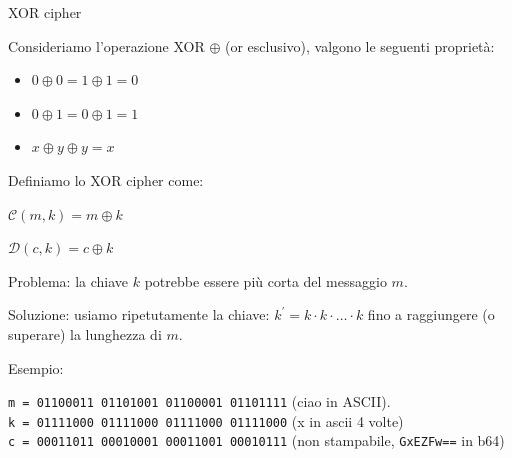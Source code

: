 \documentclass[xcolor=dvipsnames,aspectratio=169]{beamer}
\begin{document}
\begin{frame}{XOR cipher}

  Consideriamo l'operazione XOR $\oplus$ (or esclusivo), valgono le seguenti proprietà:
  
  \begin{itemize}
    \item $0 \oplus 0 = 1 \oplus 1 = 0$ 
    \item $0 \oplus 1 = 0 \oplus 1 = 1$ 
    \item $x \oplus y \oplus y = x$ 
  \end{itemize}
  
  \medskip
  \pause
  
  Definiamo lo XOR cipher come:
    
  $\mathcal{C}(m, k) = m \oplus k$ 
  
  $\mathcal{D}(c, k) = c \oplus k$

  \medskip
  
  \pause

  Problema: la chiave $k$ potrebbe essere più corta del messaggio $m$.
  
  Soluzione: usiamo ripetutamente la chiave: $k^{'} = k \cdot k \cdot \ldots \cdot k$ fino a raggiungere (o superare) la lunghezza di $m$.

  \medskip
  \pause
  
  Esempio:
  
  \texttt{m = 01100011 01101001 01100001 01101111} (ciao in ASCII).\\
  \texttt{k = 01111000 01111000 01111000 01111000} (x in ascii 4 volte)\\
  \texttt{c = 00011011 00010001 00011001 00010111} (non stampabile, \texttt{GxEZFw==} in b64)
  
  
\end{frame}
\end{document}
